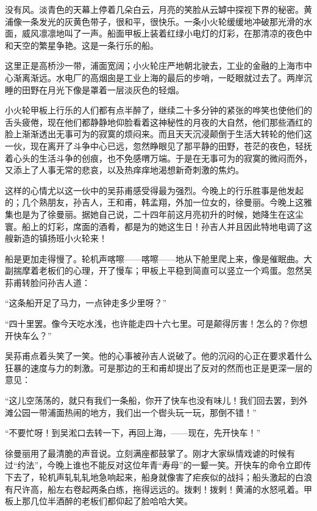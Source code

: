 \par 没有风。淡青色的天幕上停着几朵白云，月亮的笑脸从云罅中探视下界的秘密。黄浦像一条发光的灰黄色带子，很和平，很快乐。一条小火轮缓缓地冲破那光滑的水面，威风凛凛地叫了一声。船面甲板上装着红绿小电灯的灯彩，在那清凉的夜色中和天空的繁星争艳。这是一条行乐的船。
\par 这里正是高桥沙一带，浦面宽阔；小火轮庄严地朝北驶去，工业的金融的上海市中心渐离渐远。水电厂的高烟囱是工业上海的最后的步哨，一眨眼就过去了。两岸沉睡的田野在月光下像是罩着一层淡灰色的轻烟。
\par 小火轮甲板上行乐的人们都有点半醉了，继续二十多分钟的紧张的哗笑也使他们的舌头疲倦，现在他们都静静地仰脸看着这神秘性的月夜的大自然，他们那些酒红的脸上渐渐透出无事可为的寂寞的烦闷来。而且天天沉浸颠倒于生活大转轮的他们这一伙，现在离开了斗争中心已远，忽然睁眼见了那平静的田野，苍茫的夜色，轻抚着心头的生活斗争的创痕，也不免感喟万端。于是在无事可为的寂寞的微闷而外，又添上了人事无常的悲哀，以及热痒痒地渴想新奇刺激的焦灼。
\par 这样的心情尤以这一伙中的吴荪甫感受得最为强烈。今晚上的行乐胜事是他发起的；几个熟朋友，孙吉人，王和甫，韩孟翔，外加一位女的，徐曼丽。今晚上这雅集也是为了徐曼丽。据她自己说，二十四年前这月亮初升的时候，她降生在这尘寰。船上的灯彩，席面的酒肴，都是为的她这生日！孙吉人并且因此特地电调了这艘新造的镇扬班小火轮来！
\par 船是更加走得慢了。轮机声喀嚓——喀嚓——地从下舱里爬上来，像是催眠曲。大副揣摩着老板们的心理，开了慢车；甲板上平稳到简直可以竖立一个鸡蛋。忽然吴荪甫转脸问孙吉人道：
\par “这条船开足了马力，一点钟走多少里呀？”
\par “四十里罢。像今天吃水浅，也许能走四十六七里。可是颠得厉害！怎么的？你想开快车么？”
\par 吴荪甫点着头笑了一笑。他的心事被孙吉人说破了。他的沉闷的心正在要求着什么狂暴的速度与力的刺激。可是那边的王和甫却提出了反对的然而也正是更深一层的意见：
\par “这儿空荡荡的，就只有我们一条船，你开了快车也没有味儿！我们回去罢，到外滩公园一带浦面热闹的地方，我们出一个辔头玩一玩，那倒不错！”
\par “不要忙呀！到吴淞口去转一下，再回上海，——现在，先开快车！”
\par 徐曼丽用了最清脆的声音说。立刻满座都鼓掌了。刚才大家纵情戏谑的时候有过“约法”，今晚上谁也不能反对这位年青“寿母”的一颦一笑。开快车的命令立即传下去了，轮机声轧轧轧地急响起来，船身就像害了疟疾似的战抖；船头激起的白浪有尺许高，船左右卷起两条白练，拖得远远的。拨剌！拨剌！黄浦的水怒吼着。甲板上那几位半酒醉的老板们都仰起了脸哈哈大笑。
